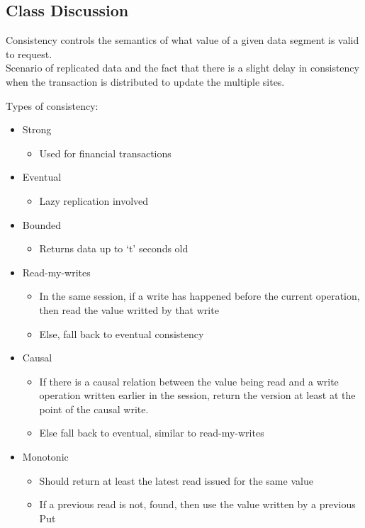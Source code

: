 \documentclass[a4paper]{article}
\begin{document}
\subsection{Class Discussion}

Consistency controls the semantics of what value of a given data segment
is valid to request.\\
Scenario of replicated data and the fact that there is a slight delay in
consistency when the transaction is distributed to update the multiple
sites.

Types of consistency:

\begin{itemize}
\item
    Strong

    \begin{itemize}
        \item
        Used for financial transactions
    \end{itemize}
\item
    Eventual

    \begin{itemize}
        \item
        Lazy replication involved
    \end{itemize}
\item
    Bounded

    \begin{itemize}
        \item
        Returns data up to `t' seconds old
    \end{itemize}
\item
    Read-my-writes

    \begin{itemize}
        \item
        In the same session, if a write has happened before the current
        operation, then read the value writted by that write
    \item
        Else, fall back to eventual consistency
    \end{itemize}
\item
    Causal

    \begin{itemize}
        \item
        If there is a causal relation between the value being read and a
        write operation written earlier in the session, return the version
        at least at the point of the causal write.
    \item
        Else fall back to eventual, similar to read-my-writes
    \end{itemize}
\item
    Monotonic

    \begin{itemize}
        \item
        Should return at least the latest read issued for the same value
    \item
        If a previous read is not, found, then use the value written by a
        previous Put
    \end{itemize}
\end{itemize}
\end{document}
